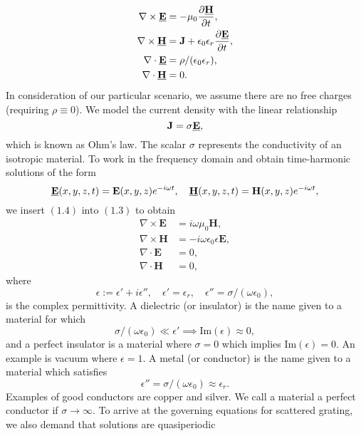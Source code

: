 \begin{subequations}
\begin{align}
\nabla \times \textbf{\underline{E}} &= -\mu_0\frac{\partial \textbf{\underline{H}}}{\partial t}, \\
\nabla \times \textbf{\underline{H}} &= \textbf{J} + \epsilon_0\epsilon_r\frac{\partial \textbf{\underline{E}}}{\partial t},\\
\nabla\cdot \textbf{\underline{E}} &= \rho/(\epsilon_0\epsilon_r),\\
\nabla\cdot \textbf{\underline{H}}&=0.
\end{align}
\end{subequations}
In consideration of our particular scenario, we assume there are no free charges (requiring $\rho\equiv 0$). We model the current density with the linear relationship
$$\textbf{J}=\sigma \textbf{\underline{E}},$$
which is known as Ohm's law. The scalar $\sigma$ represents the conductivity of an isotropic material. To work in the frequency domain and obtain time-harmonic solutions of the form
\begin{equation}\textbf{\underline{E}}(x,y,z,t)=\textbf{E}(x,y,z)e^{-i\omega t},\quad \textbf{\underline{H}}(x,y,z,t)= \textbf{H}(x,y,z)e^{-i\omega t},\end{equation}
we insert $(1.4)$ into $(1.3)$ to obtain
\begin{subequations}
\begin{align}
\nabla \times \textbf{E} &= i\omega\mu_0 \textbf{H},\\
\nabla \times \textbf{H} &= -i\omega\epsilon_0\epsilon \textbf{E},\\
\nabla\cdot \textbf{E} &= 0,\\
\nabla\cdot \textbf{H}&=0,
\end{align}
\end{subequations}
where 
$$\epsilon:=\epsilon'+i\epsilon'', \quad \epsilon'=\epsilon_r, \quad \epsilon''= \sigma/(\omega\epsilon_0),$$ 
is the complex permittivity. A dielectric (or insulator) is the name given to a material for which
$$\sigma/(\omega\epsilon_0)\ll \epsilon' \implies \text{Im}(\epsilon)\approx 0,$$
and a perfect insulator is a material where $\sigma =0$ which implies $\text{Im}(\epsilon)=0$. An example is vacuum where $\epsilon =1$. A metal (or conductor) is the name given to a material which satisfies
$$\epsilon'' = \sigma/(\omega\epsilon_0)\approx \epsilon_r.$$
Examples of good conductors are copper and silver. We call a material a perfect conductor if $\sigma \to \infty$.
To arrive at the governing equations for scattered grating, we also demand that solutions are quasiperiodic

